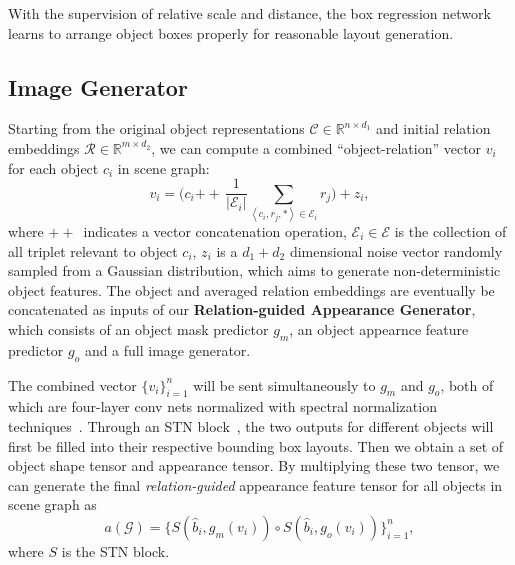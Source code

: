 With the supervision of relative scale and distance, the box regression network learns to arrange object boxes properly for reasonable layout generation. 


\subsection{Image Generator}
Starting from the original object representations $\mathcal{C}\in\mathbb{R}^{n\times d_1}$ and initial relation embeddings $\mathcal{R}\in\mathbb{R}^{m\times d_2}$, we can compute a combined ``object-relation'' vector $v_i$ for each object $c_i$ in scene graph:
\newcommand{\concat}{\ensuremath{+\!\!\!\!+\,}}
\begin{equation}
    v_i = \Big(c_i\concat\frac{1}{|\mathcal{E}_i|}\sum_{\left \langle c_i, r_j,*\right\rangle \in \mathcal{E}_i} r_j\Big) + z_i,
\label{rel_guided}
\end{equation}
where $\concat$ indicates a vector concatenation operation, $\mathcal{E}_i\in\mathcal{E}$ is the collection of all triplet relevant to object $c_i$, $z_i$ is a $d_1+d_2$ dimensional noise vector randomly sampled from a Gaussian distribution, which aims to generate non-deterministic object features. The object and averaged relation embeddings are eventually be concatenated as inputs of our \textbf{Relation-guided Appearance Generator}, which consists of an object mask predictor $g_m$, an object appearnce feature predictor $g_o$ and a full image generator.%

The combined vector $\{v_i\}_{i=1}^n$ will be sent simultaneously to $g_m$ and $g_o$, both of which are four-layer conv nets normalized with spectral normalization techniques~\cite{miyato2018spectral}. Through an STN block~\cite{spatial2015Jaderberg}, the two outputs for different objects will first be filled into their respective bounding box layouts. Then we obtain a set of object shape tensor and appearance tensor. By multiplying these two tensor, we can generate the final \textit{relation-guided} appearance feature tensor for all objects in scene graph as 
\begin{equation}
    a(\mathcal{G}) = \{S(\widehat{b}_i, g_m(v_i))\circ S(\widehat{b}_i, g_o(v_i))\}_{i=1}^{n},
\end{equation}
where $S$ is the STN block.

